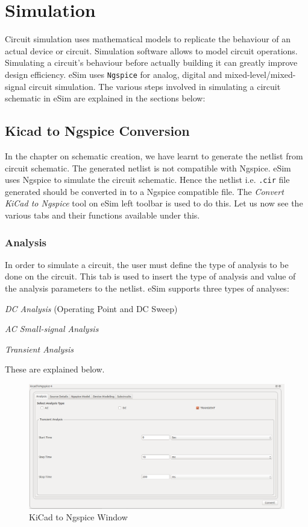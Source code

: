 \chapter{Simulation}
\thispagestyle{empty}
\label{chap6}

Circuit simulation  uses mathematical models
to replicate the behaviour of an actual device or circuit. Simulation
software allows to model circuit operations. Simulating a
circuit's behaviour before actually building it can greatly improve
design efficiency. eSim uses {\tt Ngspice} for analog, digital and
mixed-level/mixed-signal circuit simulation. The various steps involved in simulating a circuit schematic in eSim are explained in the sections below:

\section {Kicad to Ngspice Conversion}
In the chapter on schematic creation, we have learnt to generate the netlist from circuit schematic. The generated netlist is not compatible with Ngspice. eSim uses Ngspice to simulate the circuit schematic. Hence the netlist i.e. {\tt .cir} file generated should be converted in to a  Ngspice compatible file. The \textit{Convert KiCad to Ngspice} tool on eSim left toolbar is used to do this. Let us now see the various tabs and their functions available under this.   

\subsection {Analysis} \label{ana}
In order to simulate a circuit, the user must define the type of
analysis to be done on the circuit. This tab is used to insert the type of analysis and  value of the analysis parameters to the netlist. eSim supports three types of analyses:
\begin{inparaenum}
\item \textit {DC Analysis} (Operating Point and DC Sweep) 
\item \textit {AC Small-signal Analysis}  
\item \textit {Transient Analysis} 
\end{inparaenum}
These are explained below. %

\begin{figure}
\centering
\includegraphics[width=\lgfig]{analysis.png}
\caption{KiCad to Ngspice Window}
\label{analysis}
\end{figure}

